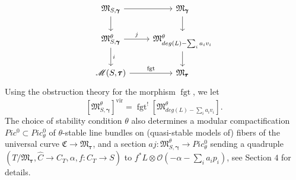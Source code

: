 \documentclass[12pt, oneside]{amsart}   	%
\newcommand{\NN}{\mathbb{N}}
\newcommand{\fgt}{\operatorname{fgt}}
\newcommand{\vir}{\operatorname{vir}}
\numberwithin{equation}{section}
\numberwithin{thm}{section}
\numberwithin{figure}{section}
\begin{document}
 


\begin{equation}\label{stau}
\begin{tikzcd}
\mathfrak{M}_{S,\pmb\gamma} \arrow{r} \arrow{d} & \mathfrak{M}_{\pmb\gamma}\arrow{d}\\
\mathfrak{M}^\theta_{S,\pmb\gamma} \arrow[r,"j"]\arrow[d,"i"] & \mathfrak{M}^\theta_{deg(L) - \sum_i a_iv_i}\arrow{d}\\
\mathscr{M}(S,\pmb\tau) \arrow[r,"\fgt"] & \mathfrak{M}_{\pmb\tau}
\end{tikzcd}
\end{equation}
Using the obstruction theory for the morphism $\fgt$, we let 
$$[\mathfrak{M}_{S,\pmb\gamma}^\theta]^{\vir} = \fgt^![\mathfrak{M}^\theta_{deg(L) - \sum_i a_iv_i}].$$
The choice of stability condition $\theta$ also determines a modular compactification $Pic^0 \subset Pic^0_{\theta}$ of $\theta$-stable line bundles on (quasi-stable models of) fibers of the universal curve $\mathfrak{C} \rightarrow \mathfrak{M}_{\pmb\tau}$, and a section $aj: \mathfrak{M}^\theta_{S,\pmb\gamma} \rightarrow Pic^0_{\theta}$ sending a quadruple $(T/\mathfrak{M}_{\pmb\tau},\widehat{C}\rightarrow C_T,\alpha,f:C_T \rightarrow S)$ to $f^*L \otimes \mathcal{O}(-\alpha - \sum_i a_ip_i)$, see \cite{logDR} Section $4$ for details.




\end{document}
